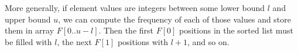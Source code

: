 \documentclass[preview]{standalone}
\begin{document}
\begin{center}
More generally, if element values are integers between some lower bound $l$ and upper bound $u$, we can compute the frequency of each of those values and store them in array $F[0..u - l]$. Then the first $F[0]$ positions in the sorted list must be filled with $l$, the next $F[1]$ positions with $l + 1$, and so on.
\end{center}
\end{document}
